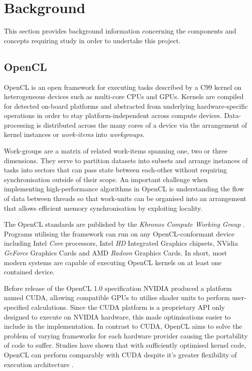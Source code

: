 \section{Background}
This section provides background information concerning the components and concepts requiring study in order to undertake this project.
\subsection{OpenCL}
OpenCL is an open framework for executing tasks described by a C99 kernel on heterogeneous devices such as multi-core CPUs and GPUs. Kernels are compiled for detected on-board platforms and abstracted from underlying hardware-specific operations in order to stay platform-independent across compute devices. Data-processing is distributed across the many cores of a device via the arrangement of kernel instances or \emph{work-items} into \emph{workgroups}.

Work-groups are a matrix of related work-items spanning one, two or three dimensions. They serve to partition datasets into subsets and arrange instances of tasks into sectors that can pass state between each-other without requiring synchronisation outside of their scope. An important challenge when implementing high-performance algorithms in OpenCL is understanding the flow of data between threads so that work-units can be organised into an arrangement that allows efficient memory synchronisation by exploiting locality. \cite{bestpractice}

The OpenCL standards are published by the \emph{Khronos Compute Working Group} \cite{khronos}.
Programs utilising the framework can run on any OpenCL-conformant device including Intel \emph{Core} processors, Intel \emph{HD} Integrated Graphics chipsets, NVidia \emph{GeForce} Graphics Cards and AMD \emph{Radeon} Graphics Cards.
In short, most modern systems are capable of executing OpenCL kernels on at least one contained device.

Before release of the OpenCL 1.0 specification NVIDIA produced a platform named \ac{CUDA}, allowing compatible GPUs to utilise shader units to perform user-specified calculations. Since the CUDA platform is a proprietary API only designed to execute on NVIDIA hardware, this made optimisations easier to include in the implementation. In contrast to CUDA, OpenCL aims to solve the problem of varying frameworks for each hardware provider causing the portability of code to suffer. Studies have shown that with sufficiently optimised kernel code, OpenCL can perform comparably with CUDA despite it's greater flexibility of execution architecture \cite{perf}.
